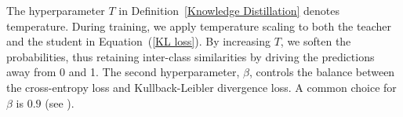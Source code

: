 The hyperparameter $T$ in Definition~\ref{Knowledge Distillation}  denotes temperature. During training, we apply temperature scaling to both the teacher and the student in Equation~(\ref{KL loss}). By increasing $T$, we soften the probabilities, thus retaining inter-class similarities by driving the predictions away from 0 and 1. The second hyperparameter, $\beta$, controls the balance between the cross-entropy loss and Kullback-Leibler divergence loss. A common choice for $\beta$ is $0.9$ (see \cite{ChoHariharan2019}).


